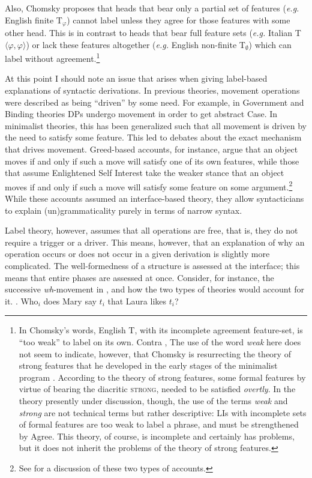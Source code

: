 \documentclass[MilwayThesis]{subfiles}
\begin{document}
Also, Chomsky proposes that heads that bear only a partial set of features (\textit{e.g.} English finite T$_\varphi$) cannot label unless they agree for those features with some other head.
This is in contrast to heads that bear full feature sets (\textit{e.g.} Italian T${\langle\varphi,\varphi\rangle}$) or lack these features altogether (\textit{e.g.} English non-finite T$_\emptyset$) which can label without agreement.\footnote{
	In Chomsky's words, English T, with its incomplete agreement feature-set, is ``too weak'' to label on its own. 
	Contra \textcite{gallego2017remark}, The use of the word \textit{weak} here does not seem to indicate, however, that Chomsky is resurrecting the theory of strong features that he developed in the early stages of the minimalist program \parencite{chomsky1995minimalist,chomsky2000minimalist}.
	According to the theory of strong features, some formal features by virtue of bearing the diacritic \textsc{strong}, needed to be satisfied \textit{overtly}.
	In the theory presently under discussion, though, the use of the terms \textit{weak} and \textit{strong} are not technical terms but rather descriptive: 
	LIs with incomplete sets of formal features are too weak to label a phrase, and must be strengthened by Agree.
	This theory, of course, is incomplete and certainly has problems, but it does not inherit the problems of the theory of strong features.
}

At this point I should note an issue that arises when giving label-based explanations of syntactic derivations.
In previous theories, movement operations were described as being ``driven'' by some need.
For example, in Government and Binding theories DPs undergo movement in order to get abstract Case.
In minimalist theories, this has been generalized such that all movement is driven by the need to satisfy some feature.
This led to debates about the exact mechanism that drives movement. 
Greed-based accounts, for instance, argue that an object moves if and only if such a move will satisfy one of its own features, while those that assume Enlightened Self Interest take the weaker stance that an object moves if and only if such a move will satisfy some feature on some argument.\footnote{
	See \textcite{lasnik1999last} for a discussion of these two types of accounts.
}
While these accounts assumed an interface-based theory, they allow syntacticians to explain (un)grammaticality purely in terms of narrow syntax.

Label theory, however, assumes that all operations are free, that is, they do not require a trigger or a driver.
This means, however, that an explanation of why an operation occurs or does not occur in a given derivation is slightly more complicated.
The well-formedness of a structure is assessed at the interface; this means that entire phases are assessed at once.
Consider, for instance, the successive \textit{wh}-movement in \Next, and how the two types of theories would account for it.
\ex. Who$_i$ does Mary say $t_i$ that Laura likes $t_i$?
\end{document}
